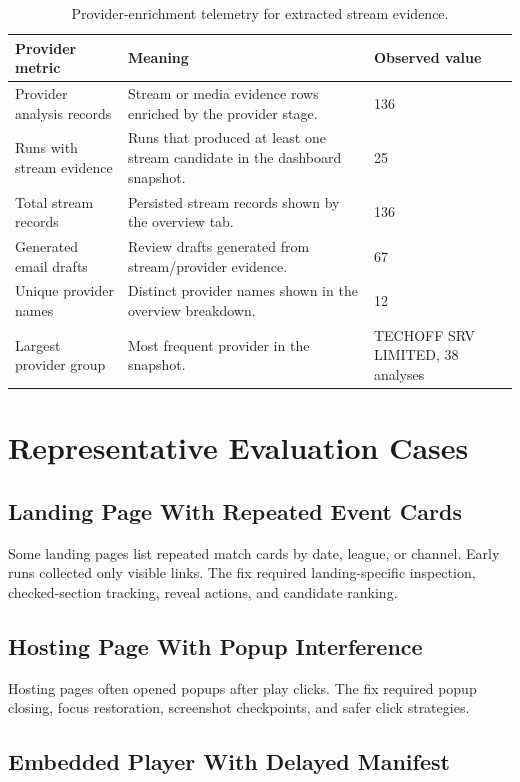 \begin{table}[!htbp]
\centering
\begin{tabularx}{\textwidth}{Q{3.8cm}Y Z{2.8cm}}
\toprule
{}
Provider metric & Meaning & Observed value \\
\midrule
Provider analysis records & Stream or media evidence rows enriched by the
provider stage. & 136 \\
Runs with stream evidence & Runs that produced at least one stream candidate in
the dashboard snapshot. & 25 \\
Total stream records & Persisted stream records shown by the overview tab. &
136 \\
Generated email drafts & Review drafts generated from stream/provider evidence.
& 67 \\
Unique provider names & Distinct provider names shown in the overview
breakdown. & 12 \\
Largest provider group & Most frequent provider in the snapshot. & TECHOFF SRV
LIMITED, 38 analyses \\
\bottomrule
\end{tabularx}
\caption{Provider-enrichment telemetry for extracted stream evidence.}
\label{tab:provider-intelligence-values}
\end{table}

\section{Representative Evaluation Cases}

\subsection{Landing Page With Repeated Event Cards}

Some landing pages list repeated match cards by date, league, or channel. Early
runs collected only visible links. The fix required landing-specific
inspection, checked-section tracking, reveal actions, and candidate ranking.

\subsection{Hosting Page With Popup Interference}

Hosting pages often opened popups after play clicks. The fix required popup
closing, focus restoration, screenshot checkpoints, and safer click strategies.

\subsection{Embedded Player With Delayed Manifest}

